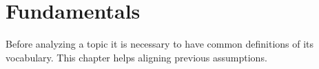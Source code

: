 \chapter{Fundamentals}


Before analyzing a topic it is necessary to have common definitions of its vocabulary.
This chapter helps aligning previous assumptions.
